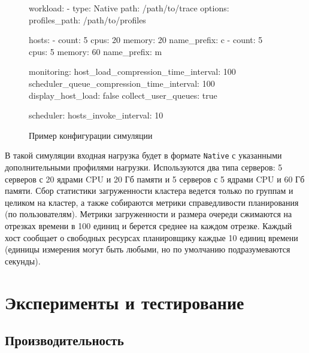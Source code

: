 \begin{figure}[h!]
    \footnotesize
    \begin{yamlcode}
                    workload:
                      - type: Native
                        path: /path/to/trace
                        options: 
                          profiles_path: /path/to/profiles
                    
                    hosts: 
                      - count: 5
                        cpus: 20
                        memory: 20
                        name_prefix: c
                      - count: 5
                        cpus: 5
                        memory: 60
                        name_prefix: m
                    
                    monitoring:
                      host_load_compression_time_interval: 100
                      scheduler_queue_compression_time_interval: 100
                      display_host_load: false 
                      collect_user_queues: true
                    
                    scheduler:
                      hosts_invoke_interval: 10
\end{yamlcode}
\caption{Пример конфигурации симуляции}
\label{fig:example-sim-config}
\end{figure}

В такой симуляции входная нагрузка будет в формате \texttt{Native} с указанными дополнительными профилями нагрузки. Используются два типа серверов: 5 серверов с 20 ядрами CPU и 20 Гб памяти и 5 серверов с 5 ядрами CPU и 60 Гб памяти. Сбор статистики загруженности кластера ведется только по группам и целиком на кластер, а также собираются метрики справедливости планирования (по пользователям). Метрики загруженности и размера очереди сжимаются на отрезках времени в 100 единиц и берется среднее на каждом отрезке. Каждый хост сообщает о свободных ресурсах планировщику каждые 10 единиц времени (единицы измерения могут быть любыми, но по умолчанию подразумеваются секунды). 


\section{Эксперименты и тестирование}\label{sec:experiments}

\subsection{Производительность}\label{sec:experiments-speed}

